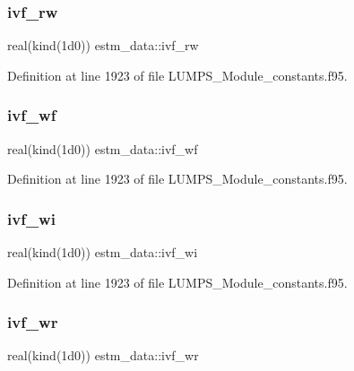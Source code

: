 \subsubsection{\texorpdfstring{ivf\+\_\+rw}{ivf\_rw}}
{\footnotesize\ttfamily real(kind(1d0)) estm\+\_\+data\+::ivf\+\_\+rw}



Definition at line 1923 of file L\+U\+M\+P\+S\+\_\+\+Module\+\_\+constants.\+f95.

\mbox{\label{namespaceestm__data_a128bd45a4f54f0a88d5766f4279149b4}} 
\subsubsection{\texorpdfstring{ivf\+\_\+wf}{ivf\_wf}}
{\footnotesize\ttfamily real(kind(1d0)) estm\+\_\+data\+::ivf\+\_\+wf}



Definition at line 1923 of file L\+U\+M\+P\+S\+\_\+\+Module\+\_\+constants.\+f95.

\mbox{\label{namespaceestm__data_a9d33b951364de9c96e2dfc357f5f05b6}} 
\subsubsection{\texorpdfstring{ivf\+\_\+wi}{ivf\_wi}}
{\footnotesize\ttfamily real(kind(1d0)) estm\+\_\+data\+::ivf\+\_\+wi}



Definition at line 1923 of file L\+U\+M\+P\+S\+\_\+\+Module\+\_\+constants.\+f95.

\mbox{\label{namespaceestm__data_ae31b6c07de2519af3d053132ab347cb4}} 
\subsubsection{\texorpdfstring{ivf\+\_\+wr}{ivf\_wr}}
{\footnotesize\ttfamily real(kind(1d0)) estm\+\_\+data\+::ivf\+\_\+wr}



